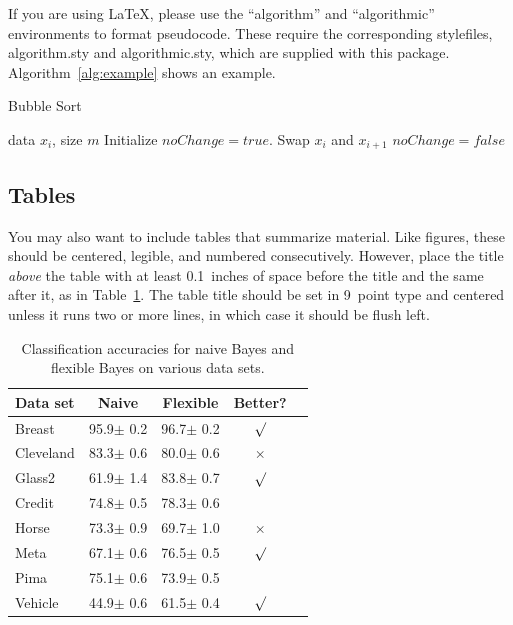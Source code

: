 \documentclass{article}
\begin{document}
If you are using \LaTeX, please use the ``algorithm'' and ``algorithmic''
environments to format pseudocode. These require
the corresponding stylefiles, algorithm.sty and
algorithmic.sty, which are supplied with this package.
Algorithm~\ref{alg:example} shows an example.

\begin{algorithm}[tb]
   \caption{Bubble Sort}
   \label{alg:example}
\begin{algorithmic}
    data $x_i$, size $m$
   \REPEAT
   \STATE Initialize $noChange = true$.
   \STATE Swap $x_i$ and $x_{i+1}$
   \STATE $noChange = false$
   \ENDIF
   \ENDFOR
\end{algorithmic}
\end{algorithm}

\subsection{Tables}

You may also want to include tables that summarize material. Like
figures, these should be centered, legible, and numbered consecutively.
However, place the title \emph{above} the table with at least
0.1~inches of space before the title and the same after it, as in
Table~\ref{sample-table}. The table title should be set in 9~point
type and centered unless it runs two or more lines, in which case it
should be flush left.


\begin{table}[t]
\caption{Classification accuracies for naive Bayes and flexible
Bayes on various data sets.}
\label{sample-table}
\vskip 0.15in
\begin{center}
\begin{small}
\begin{sc}
\begin{tabular}{lcccr}
\toprule
Data set & Naive & Flexible & Better? \\
\midrule
Breast    & 95.9$\pm$ 0.2& 96.7$\pm$ 0.2& $\surd$ \\
Cleveland & 83.3$\pm$ 0.6& 80.0$\pm$ 0.6& $\times$\\
Glass2    & 61.9$\pm$ 1.4& 83.8$\pm$ 0.7& $\surd$ \\
Credit    & 74.8$\pm$ 0.5& 78.3$\pm$ 0.6&         \\
Horse     & 73.3$\pm$ 0.9& 69.7$\pm$ 1.0& $\times$\\
Meta      & 67.1$\pm$ 0.6& 76.5$\pm$ 0.5& $\surd$ \\
Pima      & 75.1$\pm$ 0.6& 73.9$\pm$ 0.5&         \\
Vehicle   & 44.9$\pm$ 0.6& 61.5$\pm$ 0.4& $\surd$ \\
\bottomrule
\end{tabular}
\end{sc}
\end{small}
\end{center}
\vskip -0.1in
\end{table}
\end{document}
